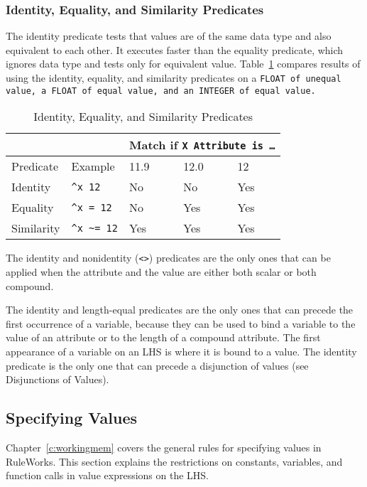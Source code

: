 \subsubsection*{Identity, Equality, and Similarity Predicates}

The identity predicate tests that values are of the same data type and
also equivalent to each other. It executes faster than the equality
predicate, which ignores data type and tests only for equivalent
value. Table~\ref{t:3-3} compares results of using the identity, equality, and
similarity predicates on a \tt{FLOAT} of unequal value, a \tt{FLOAT}
of equal value, and an \tt{INTEGER} of equal value.

\begin{table}[h]
  \centering
  \begin{tabular}{lllll}
    \toprule
    & & \multicolumn{3}{l}{Match if \ct\tt{X} Attribute is \ldots} \\
    \midrule
    Predicate & Example & 11.9 & 12.0 & 12 \\
    \midrule
    Identity & \verb|^x 12| & No & No & Yes \\
    Equality & \verb|^x = 12| & No & Yes & Yes \\
    Similarity & \verb|^x ~= 12| & Yes & Yes & Yes \\
    \bottomrule
  \end{tabular}
  \caption{Identity, Equality, and Similarity Predicates}
  \label{t:3-3}
\end{table}

The identity and nonidentity (\verb|<>|) predicates are the only ones
that can be applied when the attribute and the value are either both
scalar or both compound.

The identity and length-equal predicates are the only ones that can
precede the first occurrence of a variable, because they can be used
to bind a variable to the value of an attribute or to the length of a
compound attribute. The first appearance of a variable on an LHS is
where it is bound to a value. The identity predicate is the only one
that can precede a disjunction of values (see Disjunctions of Values).

\subsection{Specifying Values}

Chapter~\ref{c:workingmem} covers the general rules for specifying
values in RuleWorks. This section explains the restrictions on
constants, variables, and function calls in value expressions on the
LHS.

